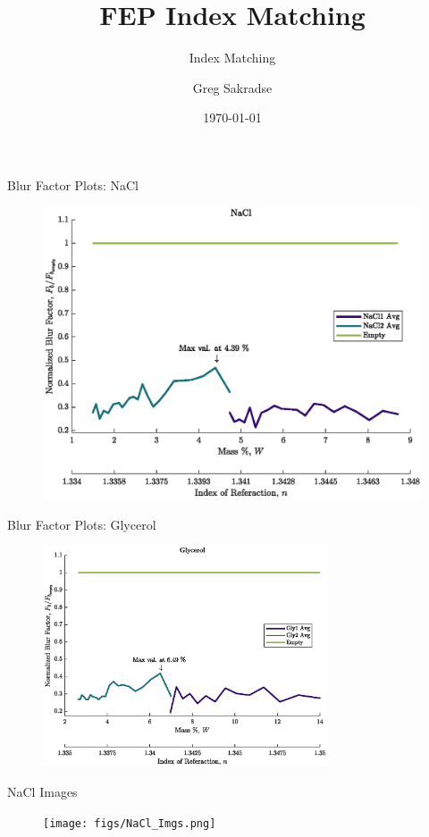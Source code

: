 \documentclass[10pt]{beamer}
\title{FEP Index Matching}
\subtitle{Index Matching}
\date{\today}
\author{Greg Sakradse}
\begin{document}
\begin{frame}{Blur Factor Plots: NaCl}
\begin{figure}
    \centering
    \includegraphics[width = 0.75 \textwidth]{figs/NaCl_BlurPlot.eps}
    \label{NaClBlur}
\end{figure}
    
\end{frame}

\begin{frame}{Blur Factor Plots: Glycerol}
\begin{figure}
    \centering
    \includegraphics[width = 0.75\textwidth]{figs/Gly_BlurPlot.eps}
    \label{NaClBlur}
\end{figure}
    
\end{frame}

\begin{frame}{NaCl Images}
\begin{figure}
    \centering
    \texttt{[image: figs/NaCl\_Imgs.png]}
    \label{NaClImg}
\end{figure}
\end{frame}
\end{document}
